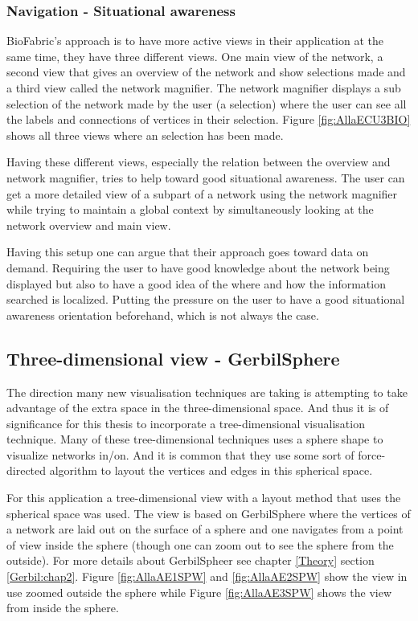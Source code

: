 \documentclass[a4paper,11pt]{kth-mag}
\begin{document}
\subsubsection{Navigation - Situational awareness}
BioFabric's approach is to have more active views in their application at the same time, they have three different views. One main 
view of the network, a second view that gives an overview of the network and show selections made and a third view called the network magnifier. The network 
magnifier displays a sub selection of the network made by the user (a selection) where the user can see all the labels and
connections of vertices in their selection. Figure \ref{fig:AllaECU3BIO} shows all three views where an selection has been made. 

Having these different views, especially the relation between the overview and  network magnifier, tries to 
help toward good situational awareness. The user can get a more detailed view of a subpart of a network using the network magnifier while trying to maintain a global 
context by simultaneously looking at the network overview and main view. 

Having this setup one can argue that their approach goes toward data on demand. Requiring the user 
to have good knowledge about the network being displayed but also to have a good idea of the where and how the
information searched is localized. Putting the pressure on the user to have a good situational 
awareness orientation beforehand, which is not always the case.
 
\subsection{Three-dimensional view - GerbilSphere}
The direction many new visualisation techniques are taking is attempting to take advantage of the extra space in the three-dimensional space. And thus it is of significance for this thesis to incorporate a 
tree-dimensional visualisation technique. Many of these tree-dimensional techniques uses a sphere shape to visualize networks in/on. And it is common that they use some sort of force-directed algorithm
to layout the vertices and edges in this spherical space.

For this application a tree-dimensional view with a layout method that uses the spherical space was used. The view is based on GerbilSphere \cite{Shelley20121016} where the vertices of a network are laid out
 on the surface of a sphere and one navigates from a point of view inside the sphere (though one can zoom out to see the sphere from the outside). For more details about GerbilSpheer see chapter \ref{Theory}
 section \ref{Gerbil:chap2}. Figure \ref{fig:AllaAE1SPW} and \ref{fig:AllaAE2SPW} show the view in use zoomed outside the sphere while Figure \ref{fig:AllaAE3SPW} shows the view from inside the sphere.
\end{document}
